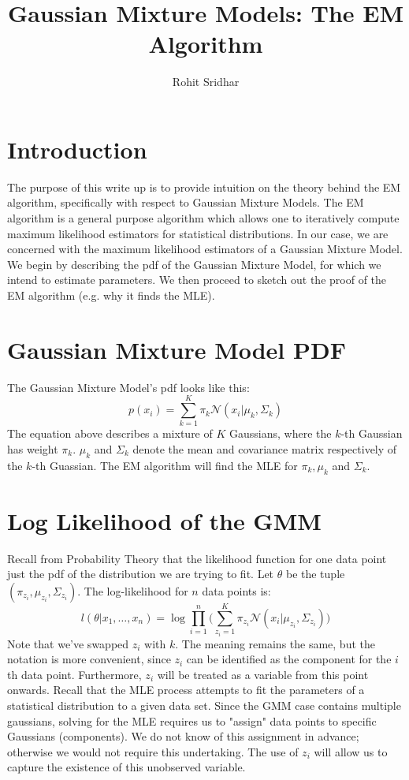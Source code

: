 \documentclass{article}
\title{Gaussian Mixture Models: The EM Algorithm}
\author{Rohit Sridhar}
\begin{document}
\maketitle

\section{Introduction}
The purpose of this write up is to provide intuition on the theory behind the EM algorithm, specifically with respect to Gaussian Mixture Models. The EM algorithm is a general purpose algorithm which allows one to iteratively compute maximum likelihood estimators for statistical distributions. In our case, we are concerned with the maximum likelihood estimators of a Gaussian Mixture Model. We begin by describing the pdf of the Gaussian Mixture Model, for which we intend to estimate parameters. We then proceed to sketch out the proof of the EM algorithm (e.g. why it finds the MLE).

\section{Gaussian Mixture Model PDF}
The Gaussian Mixture Model's pdf looks like this:
\begin{equation}
	p(x_{i}) = \sum\limits_{k = 1}^{K} \pi_{k} \mathcal{N}(x_{i} | \mu_{k}, \Sigma_{k})
\end{equation}
The equation above describes a mixture of $K$ Gaussians, where the $k$-th Gaussian has weight $\pi_{k}$. $\mu_{k}$ and $\Sigma_{k}$ denote the mean and covariance matrix respectively of the $k$-th Guassian. The EM algorithm will find the MLE for $\pi_{k}, \mu_{k}$ and $\Sigma_{k}$.

\section{Log Likelihood of the GMM}
Recall from Probability Theory that the likelihood function for one data point just the pdf of the distribution we are trying to fit. Let $\theta$ be the tuple $(\pi_{z_{i}}, \mu_{z_{i}}, \Sigma_{z_{i}})$. The log-likelihood for $n$ data points is:
\begin{equation}
	l(\theta | x_{1}, \ldots, x_{n}) = \log \prod_{i = 1}^{n} \Bigg(\sum\limits_{z_{i} = 1}^{K} \pi_{z_{i}} \mathcal{N}(x_{i} | \mu_{z_{i}}, \Sigma_{z_{i}}) \Bigg)
\end{equation}
Note that we've swapped $z_{i}$ with $k$. The meaning remains the same, but the notation is more convenient, since $z_{i}$ can be identified as the component for the $i$th data point. Furthermore, $z_{i}$ will be treated as a variable from this point onwards. Recall that the MLE process attempts to fit the parameters of a statistical distribution to a given data set. Since the GMM case contains multiple gaussians, solving for the MLE requires us to "assign" data points to specific Gaussians (components). We do not know of this assignment in advance; otherwise we would not require this undertaking. The use of $z_{i}$ will allow us to capture the existence of this unobserved variable.
\end{document}
